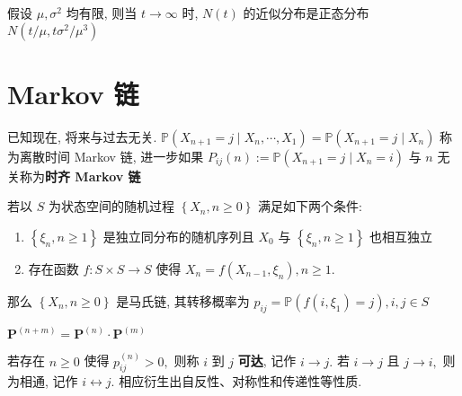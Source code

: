 \documentclass[10pt]{yerbaformat}
\begin{document}
\begin{theorem}[中心极限定理]
    假设 $\mu, \sigma^{2}$ 均有限, 则当 $t \rightarrow \infty$ 时, $N(t)$ 的近似分布是正态分布 $ N\left(t / \mu, t \sigma^{2} / \mu^{3}\right) $
\end{theorem}

\section{Markov 链}

\begin{definition}[无后效性]
    已知现在, 将来与过去无关. $\mathbb{P}\left(X_{n+1}=j \mid X_{n}, \cdots, X_{1}\right)=\mathbb{P}\left(X_{n+1}=j \mid X_{n}\right)$ 称为离散时间 Markov 链, 进一步如果 $P_{i j}(n):=\mathbb{P}\left(X_{n+1}=j \mid X_{n}=i\right)$ 与 $n$ 无关称为\textbf{时齐 Markov 链}
\end{definition}


\begin{theorem}
    若以 $S$ 为状态空间的随机过程 $\left\{X_{n}, n \geq 0\right\}$ 满足如下两个条件:
    \begin{enumerate}
        \item $\left\{\xi_{n}, n \geq 1\right\}$ 是独立同分布的随机序列且 $X_{0}$ 与 $\left\{\xi_{n}, n \geq 1\right\}$ 也相互独立
        \item 存在函数 $f: S \times S \rightarrow S$ 使得 $X_{n}=f\left(X_{n-1}, \xi_{n}\right), n \geq 1 .$
    \end{enumerate}
    那么 $\left\{X_{n}, n \geq 0\right\}$ 是马氏链, 其转移概率为 $p_{i j}=\mathbb{P}\left(f\left(i, \xi_{1}\right)=j\right), i, j \in S$
\end{theorem}

\begin{theorem}
    $\mathbf{P}^{(n+m)}=\mathbf{P}^{(n)} \cdot \mathbf{P}^{(m)}$
\end{theorem}

\begin{definition}[可达]
    若存在 $n \geq 0$ 使得 $p_{i j}^{(n)}>0,$ 则称 $i$ 到 $j$ \textbf{可达}, 记作 $i \rightarrow j .$ 若 $i \rightarrow j$ 且 $j \rightarrow i,$ 则为相通, 记作 $i \leftrightarrow j$. 相应衍生出自反性、对称性和传递性等性质.
\end{definition}
\end{document}

